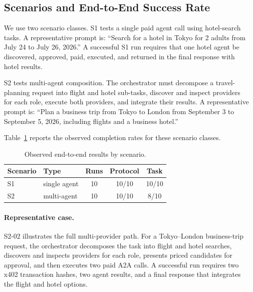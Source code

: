 \documentclass[sigconf]{acmart}
\begin{document}
\subsection{Scenarios and End-to-End Success Rate}
We use two scenario classes. S1 tests a single paid agent call using
hotel-search tasks. A representative prompt is: ``Search for a hotel in
Tokyo for 2 adults from July 24 to July 26, 2026.'' A successful S1 run
requires that one hotel agent be discovered, approved, paid, executed,
and returned in the final response with hotel results.

S2 tests multi-agent composition. The orchestrator must decompose a
travel-planning request into flight and hotel sub-tasks, discover and
inspect providers for each role, execute both providers, and integrate
their results. A representative prompt is: ``Plan a business trip from
Tokyo to London from September 3 to September 5, 2026, including
flights and a business hotel.''

Table~\ref{tab:scenarios} reports the observed completion rates for
these scenario classes.

\begin{table}[H]
  \centering
  \caption{Observed end-to-end results by scenario.}
  \label{tab:scenarios}
  \small
  \begin{tabular}{@{}llccc@{}}
    \toprule
    Scenario & Type & Runs & Protocol & Task \\
    \midrule
    S1 & single agent & 10 & 10/10 & 10/10 \\
    S2 & multi-agent  & 10 & 10/10 & 8/10 \\
    \bottomrule
  \end{tabular}
\end{table}

\paragraph{Representative case.}
S2-02 illustrates the full multi-provider path. For a Tokyo--London
business-trip request, the orchestrator decomposes the task into flight
and hotel searches, discovers and inspects providers for each role,
presents priced candidates for approval, and then executes two paid A2A
calls. A successful run requires two x402 transaction hashes, two agent
results, and a final response that integrates the flight and hotel
options.
\end{document}
